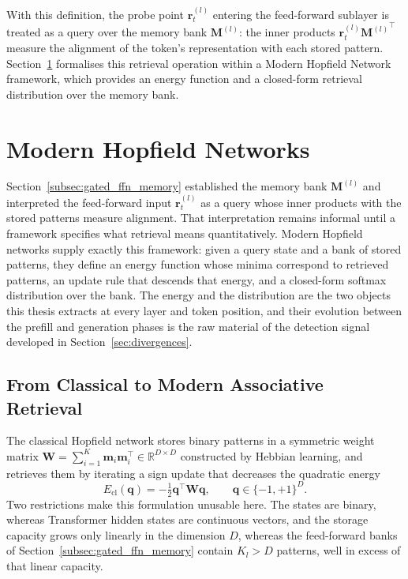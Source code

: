 With this definition, the probe point $\mathbf{r}_t^{(l)}$ entering the
feed-forward sublayer is treated as a query over the memory bank
$\mathbf{M}^{(l)}$: the inner products
$\mathbf{r}_t^{(l)}{\mathbf{M}^{(l)}}^{\!\top}$ measure the alignment of the
token's representation with each stored pattern. Section~\ref{sec:hopfield}
formalises this retrieval operation within a Modern Hopfield Network framework,
which provides an energy function and a closed-form retrieval distribution over
the memory bank.
\section{Modern Hopfield Networks}
\label{sec:hopfield}

Section~\ref{subsec:gated_ffn_memory} established the memory bank
$\mathbf{M}^{(l)}$ and interpreted the feed-forward input
$\mathbf{r}_t^{(l)}$ as a query whose inner products with the stored patterns
measure alignment. That interpretation remains informal until a framework
specifies what retrieval means quantitatively. Modern Hopfield networks supply
exactly this framework: given a query state and a bank of stored patterns, they
define an energy function whose minima correspond to retrieved patterns, an
update rule that descends that energy, and a closed-form softmax distribution
over the bank. The energy and the distribution are the two objects this thesis
extracts at every layer and token position, and their evolution between the
prefill and generation phases is the raw material of the detection signal
developed in Section~\ref{sec:divergences}.

\subsection{From Classical to Modern Associative Retrieval}
\label{subsec:classical_to_modern_hopfield}

The classical Hopfield network \citep{hopfield1982neural} stores binary
patterns in a symmetric weight matrix
$\mathbf{W} = \sum_{i=1}^{K} \mathbf{m}_i\mathbf{m}_i^\top
\in \mathbb{R}^{D \times D}$ constructed by Hebbian learning, and retrieves
them by iterating a sign update that decreases the quadratic energy
\begin{equation}
    E_{\mathrm{cl}}(\mathbf{q})
    =
    -\tfrac{1}{2}\mathbf{q}^{\top}\mathbf{W}\mathbf{q},
    \qquad \mathbf{q} \in \{-1,+1\}^D.
    \label{eq:classical_hopfield_energy}
\end{equation}
Two restrictions make this formulation unusable here. The states are binary,
whereas Transformer hidden states are continuous vectors, and the storage
capacity grows only linearly in the dimension $D$, whereas the feed-forward
banks of Section~\ref{subsec:gated_ffn_memory} contain $K_l > D$ patterns,
well in excess of that linear capacity.

